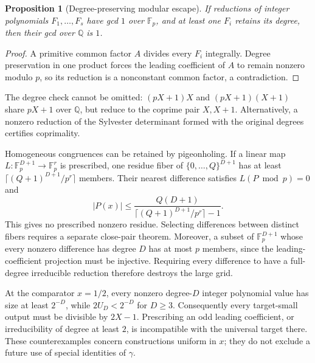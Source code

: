 \documentclass[11pt,a4paper]{article}
\newcommand{\Q}{\mathbb Q}
\newtheorem{proposition}[theorem]{Proposition}
\theoremstyle{definition}
\theoremstyle{remark}
\numberwithin{equation}{section}
\begin{document}
\begin{proposition}[Degree-preserving modular escape]\label{inf:prop:modular}
If reductions of integer polynomials $F_1,\ldots,F_s$ have gcd $1$ over $\mathbb F_p$, and at least one $F_i$ retains its degree, then their gcd over $\Q$ is $1$.
\end{proposition}
\begin{proof}
A primitive common factor $A$ divides every $F_i$ integrally. Degree preservation in one product forces the leading coefficient of $A$ to remain nonzero modulo $p$, so its reduction is a nonconstant common factor, a contradiction.
\end{proof}
The degree check cannot be omitted: $(pX+1)X$ and $(pX+1)(X+1)$ share $pX+1$ over $\Q$, but reduce to the coprime pair $X,X+1$. Alternatively, a nonzero reduction of the Sylvester determinant formed with the original degrees certifies coprimality.

Homogeneous congruences can be retained by pigeonholing. If a linear map $L:\mathbb F_p^{D+1}\to\mathbb F_p^r$ is prescribed, one residue fiber of $\{0,\ldots,Q\}^{D+1}$ has at least $\lceil(Q+1)^{D+1}/p^r\rceil$ members. Their nearest difference satisfies $L(P\bmod p)=0$ and
\[
 |P(x)|\le\frac{Q(D+1)}{\lceil(Q+1)^{D+1}/p^r\rceil-1}.
\]
This gives no prescribed nonzero residue. Selecting differences between distinct fibers requires a separate close-pair theorem. Moreover, a subset of $\mathbb F_p^{D+1}$ whose every nonzero difference has degree $D$ has at most $p$ members, since the leading-coefficient projection must be injective. Requiring every difference to have a full-degree irreducible reduction therefore destroys the large grid.

At the comparator $x=1/2$, every nonzero degree-$D$ integer polynomial value has size at least $2^{-D}$, while $2U_D<2^{-D}$ for $D\ge3$. Consequently every target-small output must be divisible by $2X-1$. Prescribing an odd leading coefficient, or irreducibility of degree at least $2$, is incompatible with the universal target there. These counterexamples concern constructions uniform in $x$; they do not exclude a future use of special identities of $\gamma$.
\end{document}

